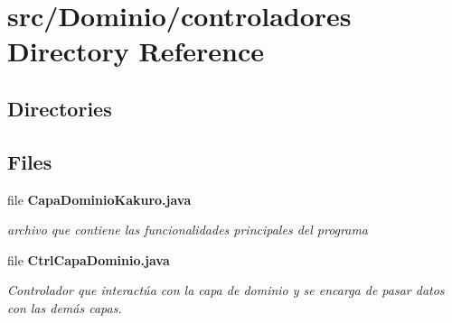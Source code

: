\section{src/\+Dominio/controladores Directory Reference}
\label{dir_ed8d8c6c302a26b75b9d80caf0d2b3c9}
\subsection*{Directories}
\begin{DoxyCompactItemize}
\end{DoxyCompactItemize}
\subsection*{Files}
\begin{DoxyCompactItemize}
\item 
file \textbf{ Capa\+Dominio\+Kakuro.\+java}
\begin{DoxyCompactList}\small\item\em archivo que contiene las funcionalidades principales del programa \end{DoxyCompactList}\item 
file \textbf{ Ctrl\+Capa\+Dominio.\+java}
\begin{DoxyCompactList}\small\item\em Controlador que interactúa con la capa de dominio y se encarga de pasar datos con las demás capas. \end{DoxyCompactList}\end{DoxyCompactItemize}

